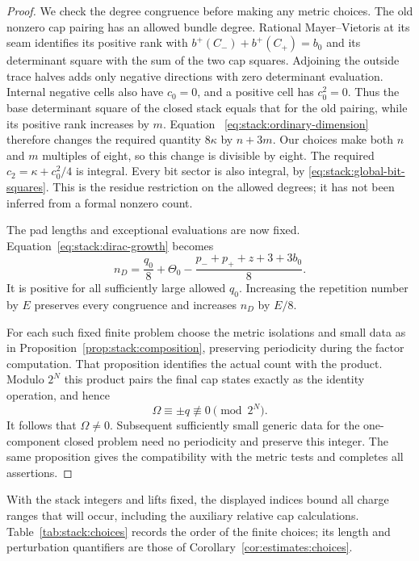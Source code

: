 \begin{proof}
We check the degree congruence before making any metric choices.
The old nonzero cap pairing has an allowed bundle degree.  Rational
Mayer--Vietoris at its seam identifies its positive rank with
\(b^+(C_-)+b^+(C_+)=b_0\) and its determinant square with the sum
of the two cap squares.  Adjoining the outside trace halves adds only
negative directions with zero determinant evaluation.  Internal
negative cells also have \(c_0=0\), and a positive cell has
\(c_0^2=0\).  Thus the base determinant square of the closed stack
equals that for the old pairing, while its positive rank increases
by \(m\).  Equation~
\eqref{eq:stack:ordinary-dimension} therefore changes the required
quantity \(8\kappa\) by \(n+3m\).  Our choices make both
\(n\) and \(m\) multiples of eight, so this change is divisible
by eight.  The required \(c_2=\kappa+c_0^2/4\) is integral.
Every bit sector is also integral, by
\eqref{eq:stack:global-bit-squares}.  This is the residue restriction
on the allowed degrees; it has not been inferred from a formal
nonzero count.

The pad lengths and exceptional evaluations are now fixed.
Equation~\eqref{eq:stack:dirac-growth} becomes
\[
 n_D=\frac{q_0}{8}
 +\Theta_0-\frac{p_-+p_++z+3+3b_0}{8}.
\]
It is positive for all sufficiently large allowed \(q_0\).
Increasing the repetition number by \(E\) preserves every
congruence and increases \(n_D\) by \(E/8\).

For each such fixed finite problem choose the metric isolations and
small data as in Proposition~\ref{prop:stack:composition}, preserving
periodicity during the factor computation.  That proposition
identifies the actual count with the product.  Modulo \(2^N\)
this product pairs the final cap states exactly as the identity
operation, and hence
\[
 \Omega\equiv\pm q\not\equiv0\pmod{2^N}.
\]
It follows that \(\Omega\ne0\).  Subsequent sufficiently small
generic data for the one-component closed problem need no
periodicity and preserve this integer.  The same proposition gives
the compatibility with the metric tests and completes all assertions.
\end{proof}

With the stack integers and lifts fixed, the displayed indices bound
all charge ranges that will occur, including the auxiliary relative
cap calculations.  Table~\ref{tab:stack:choices} records the order of
the finite choices; its length and perturbation quantifiers are those
of Corollary~\ref{cor:estimates:choices}.

